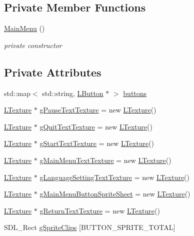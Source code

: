 \subsection*{Private Member Functions}
\begin{DoxyCompactItemize}
\item 
\mbox{\label{class_main_menu_a53eecf9d5ffd094f54ac4193e7e57eaf}} 
\mbox{\hyperlink{class_main_menu_a53eecf9d5ffd094f54ac4193e7e57eaf}{Main\+Menu}} ()
\begin{DoxyCompactList}\small\item\em private constructor \end{DoxyCompactList}\end{DoxyCompactItemize}
\subsection*{Private Attributes}
\begin{DoxyCompactItemize}
\item 
std\+::map$<$ std\+::string, \mbox{\hyperlink{class_l_button}{L\+Button}} $\ast$ $>$ \mbox{\hyperlink{class_main_menu_aadc6055e6696bd4d118dccf948797fda}{buttons}}
\item 
\mbox{\hyperlink{class_l_texture}{L\+Texture}} $\ast$ \mbox{\hyperlink{class_main_menu_ab95b95167c04402336873b2227515edb}{g\+Pause\+Text\+Texture}} = new \mbox{\hyperlink{class_l_texture}{L\+Texture}}()
\item 
\mbox{\hyperlink{class_l_texture}{L\+Texture}} $\ast$ \mbox{\hyperlink{class_main_menu_a50306a63e4407b75ce154f1581130342}{g\+Quit\+Text\+Texture}} = new \mbox{\hyperlink{class_l_texture}{L\+Texture}}()
\item 
\mbox{\hyperlink{class_l_texture}{L\+Texture}} $\ast$ \mbox{\hyperlink{class_main_menu_ad503eaed21ec90d1971ec1577095b7b6}{g\+Start\+Text\+Texture}} = new \mbox{\hyperlink{class_l_texture}{L\+Texture}}()
\item 
\mbox{\hyperlink{class_l_texture}{L\+Texture}} $\ast$ \mbox{\hyperlink{class_main_menu_a443820fab8594cc11e968ce0fe902000}{g\+Main\+Menu\+Text\+Texture}} = new \mbox{\hyperlink{class_l_texture}{L\+Texture}}()
\item 
\mbox{\hyperlink{class_l_texture}{L\+Texture}} $\ast$ \mbox{\hyperlink{class_main_menu_a5e7d9454fcc85c02a8fb6592126b8a93}{g\+Language\+Setting\+Text\+Texture}} = new \mbox{\hyperlink{class_l_texture}{L\+Texture}}()
\item 
\mbox{\hyperlink{class_l_texture}{L\+Texture}} $\ast$ \mbox{\hyperlink{class_main_menu_a03d3833a633f336c028e88783900782d}{g\+Main\+Menu\+Button\+Sprite\+Sheet}} = new \mbox{\hyperlink{class_l_texture}{L\+Texture}}()
\item 
\mbox{\hyperlink{class_l_texture}{L\+Texture}} $\ast$ \mbox{\hyperlink{class_main_menu_a5e9fea95a73ddc6ff72a18cf99d2d60a}{g\+Return\+Text\+Texture}} = new \mbox{\hyperlink{class_l_texture}{L\+Texture}}()
\item 
S\+D\+L\+\_\+\+Rect \mbox{\hyperlink{class_main_menu_adda2f50937b2c2c6b98d22785bbd18a6}{g\+Sprite\+Clips}} \mbox{[}B\+U\+T\+T\+O\+N\+\_\+\+S\+P\+R\+I\+T\+E\+\_\+\+T\+O\+T\+AL\mbox{]}
\end{DoxyCompactItemize}
